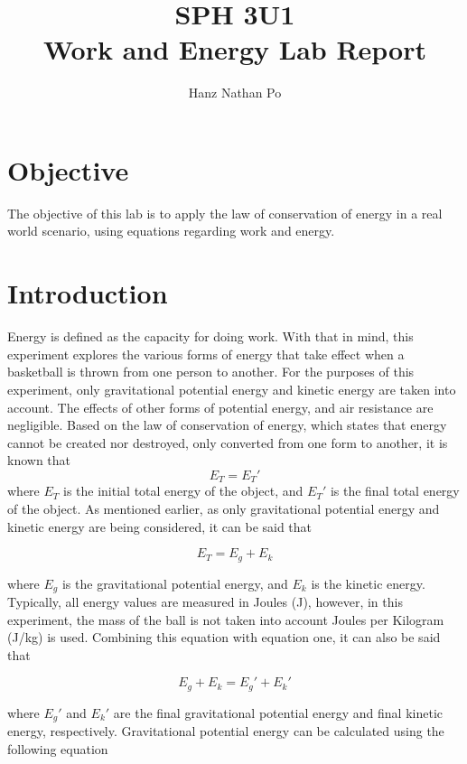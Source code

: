\documentclass[10pt,twocolumn,letterpaper]{article}
\title{
		\usefont{OT1}{bch}{b}{n}
		\normalfont \normalsize \textsc{SPH 3U1} \\ [10pt]
		\huge Work and Energy Lab Report \\
}
\author[1]{Hanz Nathan Po}
\begin{document}
\maketitle

\section{Objective}
The objective of this lab is to apply the law of conservation of energy in a real world scenario, using equations regarding work and energy.

\section{Introduction}
Energy is defined as the capacity for doing work. With that in mind, this experiment explores the various forms of energy that take effect when a basketball is thrown from one person to another. For the purposes of this experiment, only gravitational potential energy and kinetic energy are taken into account. The effects of other forms of potential energy, and air resistance are negligible. Based on the law of conservation of energy, which states that energy cannot be created nor destroyed, only converted from one form to another, it is known that
\begin{equation}
    E_{T}={E_{T}}'
\end{equation}
where \({E}_{T}\) is the initial total energy of the object, and \({E}_{T}'\) is the final total energy of the object. As mentioned earlier, as only gravitational potential energy and kinetic energy are being considered, it can be said that

\begin{equation}
    E_{T}=E_{g}+E_{k}
\end{equation}

where \({E}_{g}\) is the gravitational potential energy, and \({E}_{k}\) is the kinetic energy. Typically, all energy values are measured in Joules (J), however, in this experiment, the mass of the ball is not taken into account Joules per Kilogram (J/kg) is used. Combining this equation with equation one, it can also be said that

\begin{equation}
    E_{g}+E_{k}={E_{g}}'+{E_{k}}'
\end{equation}

where \({E_{g}}'\) and \({E_{k}}'\) are the final gravitational potential energy and final kinetic energy, respectively. Gravitational potential energy can be calculated using the following equation
\end{document}
